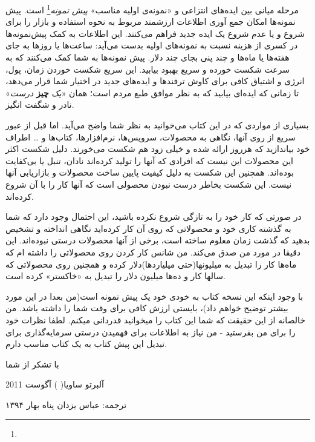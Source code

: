 مرحله میانی بین ایده‌های انتزاعی و «نمونه‌‌ی اولیه مناسب» \emph{پیش
نمونه}\footnote{} است. پیش نمونه‌ها امکان جمع آوری اطلاعات
ارزشمند مربوط به نحوه استفاده و بازار را برای شروع و یا عدم شروع یک ایده
جدید فراهم می‌کنند. این اطلاعات به کمک پیش‌نمونه‌ها در کسری از هزینه
نسبت به نمونه‌های اولیه بدست می‌آید: ساعت‌ها یا روزها به جای هفته‌ها یا
ماه‌ها و چند پنی بجای چند دلار. پیش نمونه‌ها به شما کمک می‌کنند که به
سرعت شکست خورده و سریع بهبود بیابید. این سریع شکست خوردن زمان، پول،
انرژی و اشتیاق کافی برای کاوش ترفند‌ها و ایده‌های جدید در اختیار شما
قرار می‌دهد، تا زمانی که ایده‌ای بیابید که به نظر موافق طبع مردم است؛
همان «\emph{یک} \textbf{چیز} \emph{درست}» نادر و شگفت انگیز.

بسیاری از مواردی که در این کتاب می‌خوانید به نظر شما واضح می‌آید. اما
قبل از عبور سریع از روی آنها، نگاهی به محصولات، سرویس‌ها، نرم‌افزارها،
کتاب‌ها و \ldots{} اطراف خود بیاندازید که هرروز ارائه شده و خیلی زود هم
شکست می‌خورند. دلیل شکست اکثر این محصولات این نیست که افرادی که آنها را
تولید کرده‌اند نادان، تنبل یا بی‌کفایت بوده‌اند. همچنین این شکست به دلیل
کیفیت پایین ساخت محصولات و بازاریابی آنها نیست. این شکست بخاطر درست
نبودن محصولی است که آنها کار را با آن شروع کرده‌اند.

در صورتی که کار خود را به تازگی شروع نکرده باشید، این احتمال وجود دارد
که شما به گذشته کاری خود و محصولاتی که روی آن کار کرده‌اید نگاهی انداخته
و تشخیص بدهید که گذشت زمان معلوم ساخته است، برخی از آنها محصولات درستی
نبوده‌اند. این دقیقا در مورد من صدق می‌کند. من شانس کار کردن روی
محصولاتی را داشته ام که ماه‌ها کار را تبدیل به میلیونها(حتی
میلیاردها)دلار کرده و همچنین روی محصولاتی که سالها کار و ده‌ها میلیون
دلار را تبدیل به «خاکستر» کرده است.

با وجود اینکه این نسخه کتاب به خودی خود یک پیش نمونه است(من بعدا در این
مورد بیشتر توضیح خواهم داد)، بایستی ارزش کافی برای وقت شما را داشته
باشد. من خالصانه از این حقیقت که شما این کتاب را میخوانید قدردانی میکنم.
لطفا نظرات خود را برای من بفرستید - من نیاز به اطلاعات برای فهمیدن درستی
سرمایه‌گذاری برای تبدیل این پیش کتاب به یک کتاب مناسب دارم.

با تشکر از شما

آلبرتو ساویا(  ) آگوست 2011

ترجمه: عباس یزدان پناه بهار ۱۳۹۴
